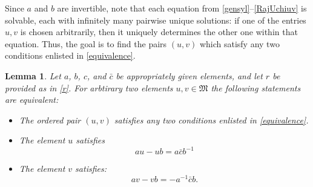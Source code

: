 \documentclass{article}
\newtheorem{lemma}{Lemma}[section]
\theoremstyle{definition}
\def\M{\mathfrak{M}}
\begin{document}
Since $a$ and $b$ are invertible, note that each equation from \eqref{gensyl}--\eqref{RajUchiuv} is solvable, each with infinitely many pairwise unique solutions: if one of the entries $u,v$ is chosen arbitrarily, then it uniquely determines the other one within that equation. Thus, the goal is to find the pairs $(u,v)$ which satisfy any two conditions enlisted in \eqref{equivalence}. 
 \begin{lemma}\label{uvsyl}
Let $a$, $b$, $c$, and $\bar{c}$ be appropriately given elements, and let $r$ be provided as in \eqref{r}. For arbtirary two elements $u,v\in\M$ the following statements are equivalent: 
\begin{itemize}
\item[(a)] The ordered pair $(u,v)$ satisfies any two conditions enlisted in \eqref{equivalence}.
\item[(b)] The element $u$ satisfies
\begin{equation}
\label{auub}
au-ub=a\bar{c}b^{-1}\end{equation}
\item[(c)] The element $v$ satisfies:
\begin{equation}\label{avvb}
av-vb=-a^{-1}\bar{c}b.
\end{equation}
\end{itemize}
\end{lemma}
\end{document}

